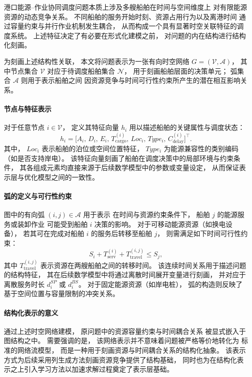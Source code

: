 \documentclass[UTF8, a4paper, 12pt]{ctexart}
\begin{document}
港口能源--作业协同调度问题本质上涉及多艘船舶在时间与空间维度上
对有限能源资源的动态竞争关系。
不同船舶的服务开始时刻、资源占用行为以及离港时间
通过容量约束与并行作业机制发生耦合，
从而构成一个具有显著时空关联特征的调度系统。
上述特征决定了有必要在形式化建模之前，
对问题的内在结构进行结构化刻画。

为刻画上述结构性关联，
本文将问题表示为一张有向时空网络
$G=(\mathcal{V},\mathcal{A})$，
其中节点集合 $\mathcal{V}$ 对应于待调度船舶集合 $\mathcal{N}$，
用于刻画船舶层面的决策单元；
弧集合 $\mathcal{A}$ 则用于表示船舶之间
因资源竞争与时间可行性约束所产生的潜在相互影响关系。

\paragraph{节点与特征表示}
对于任意节点 $i\in\mathcal{V}$，
定义其特征向量 $h_i$ 用以描述船舶的关键属性与调度状态：
\begin{equation}
h_i =
\big[
A_i,\,
D_i,\,
E_i,\,
T^{(i)}_{\text{cargo}},\,
Loc_i,\,
Type_i,\,
C^{(i)}_{\text{delay}}
\big]^{\top}.
\end{equation}
其中，
$Loc_i$ 表示船舶的泊位或空间位置特征，
$Type_i$ 为能源兼容性的类别编码（如是否支持岸电）。
该特征向量刻画了船舶在调度决策中的局部环境与约束条件，
其各组成元素均直接来源于后续数学模型中的参数或变量设定，
从而保证表示层与优化模型之间的一致性。

\paragraph{弧的定义与可行性约束}
图中的有向弧 $(i,j)\in\mathcal{A}$ 用于表示
在时间与资源约束条件下，
船舶 $j$ 的能源服务或装卸作业
可能受到船舶 $i$ 决策的影响。
对于可移动能源资源（如换电设备），
若其可在完成对船舶 $i$ 的服务后转移至船舶 $j$，
则需满足如下时间可行性约束：
\begin{equation}
S_i + T^{(i)}_{\text{serv}} + T^{(i,j)}_{\text{travel}} \le S_j ,
\end{equation}
其中 $T^{(i,j)}_{\text{travel}}$ 表示资源在两艘船舶之间的转移时间。
该连续时间关系用于描述问题的结构特征，
其在后续数学模型中将通过离散时间展开变量进行刻画，
并对应于离散服务时长 $d_i^{SP}$ 或 $d_i^{BS}$。
对于固定能源资源（如岸电桩），
弧的构造则反映了基于空间位置与容量限制的冲突关系。

\paragraph{结构化表示的意义}
通过上述时空网络建模，
原问题中的资源容量约束与时间耦合关系
被显式嵌入于图结构之中。
需要强调的是，
该网络表示并不意味着问题被严格等价地转化为
标准的网络流模型，
而是一种用于刻画资源与时间耦合关系的结构化抽象。
该表示方式为后续采用列生成方法刻画资源竞争提供了结构基础，
同时也为在结构化表示之上引入学习方法以加速求解过程奠定了表示层基础。
\end{document}
